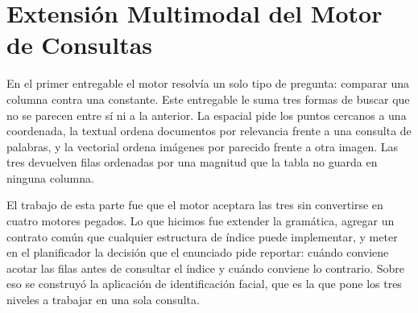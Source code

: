 \documentclass[a4paper,12pt]{article}
\begin{document}

%
%
%
%
%
%   
%

\section{Extensión Multimodal del Motor de Consultas}

En el primer entregable el motor resolvía un solo tipo de pregunta: comparar una
columna contra una constante. Este entregable le suma tres formas de buscar que
no se parecen entre sí ni a la anterior. La espacial pide los puntos cercanos a
una coordenada, la textual ordena documentos por relevancia frente a una
consulta de palabras, y la vectorial ordena imágenes por parecido frente a otra
imagen. Las tres devuelven filas ordenadas por una magnitud que la tabla no
guarda en ninguna columna.

El trabajo de esta parte fue que el motor aceptara las tres sin convertirse en
cuatro motores pegados. Lo que hicimos fue extender la gramática, agregar un
contrato común que cualquier estructura de índice puede implementar, y meter en
el planificador la decisión que el enunciado pide reportar: cuándo conviene
acotar las filas antes de consultar el índice y cuándo conviene lo contrario.
Sobre eso se construyó la aplicación de identificación facial, que es la que
pone los tres niveles a trabajar en una sola consulta.
\end{document}
